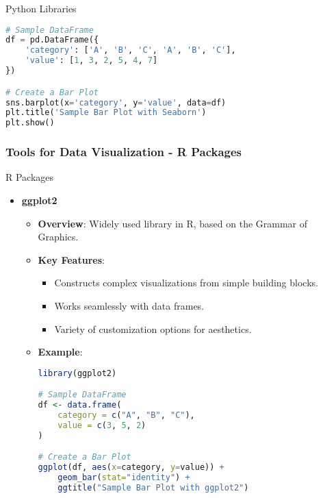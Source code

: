 \documentclass[aspectratio=169]{beamer}
\begin{document}
\begin{frame}[fragile]
\begin{block}{Python Libraries}
\begin{enumerate}
\begin{itemize}
\begin{lstlisting}[language=Python]
# Sample DataFrame
df = pd.DataFrame({
    'category': ['A', 'B', 'C', 'A', 'B', 'C'],
    'value': [1, 3, 2, 5, 4, 7]
})

# Create a Bar Plot
sns.barplot(x='category', y='value', data=df)
plt.title('Sample Bar Plot with Seaborn')
plt.show()
                    \end{lstlisting}
                \end{itemize}
        \end{enumerate}
    \end{block}
\end{frame}

\begin{frame}[fragile]
    \frametitle{Tools for Data Visualization - R Packages}
    \begin{block}{R Packages}
        \begin{itemize}
            \item \textbf{ggplot2}
                \begin{itemize}
                    \item \textbf{Overview}: Widely used library in R, based on the Grammar of Graphics.
                    \item \textbf{Key Features}:
                        \begin{itemize}
                            \item Constructs complex visualizations from simple building blocks.
                            \item Works seamlessly with data frames.
                            \item Variety of customization options for aesthetics.
                        \end{itemize}
                    \item \textbf{Example}:
                    \begin{lstlisting}[language=R]
library(ggplot2)

# Sample DataFrame
df <- data.frame(
    category = c("A", "B", "C"),
    value = c(3, 5, 2)
)

# Create a Bar Plot
ggplot(df, aes(x=category, y=value)) + 
    geom_bar(stat="identity") +
    ggtitle("Sample Bar Plot with ggplot2")
                    \end{lstlisting}
                \end{itemize}
        \end{itemize}
    \end{block}
\end{frame}
\end{document}
